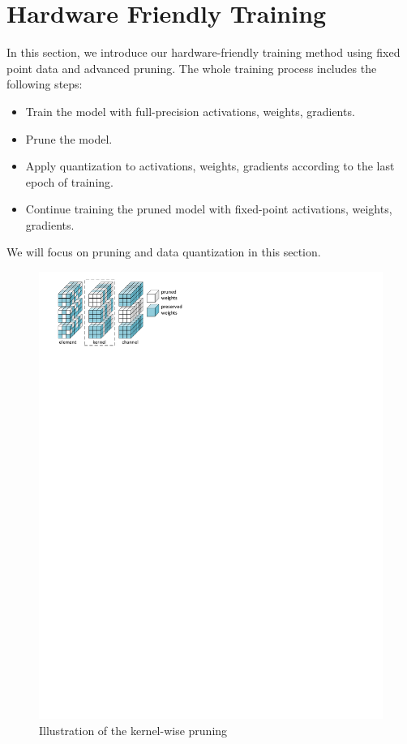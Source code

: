 \section{Hardware Friendly Training}\label{sec:training}
In this section, we introduce our hardware-friendly training method using fixed point data and advanced pruning. The whole training process includes the following steps:
\begin{itemize}
  \item Train the model with full-precision activations, weights, gradients.
  \item Prune the model. 
  \item Apply quantization to activations, weights, gradients according to the last epoch of training.  
  \item Continue training the pruned model with fixed-point activations, weights, gradients.
\end{itemize}
We will focus on pruning and data quantization in this section.

\begin{figure}[tb]
  \centering
  \includegraphics[width=0.9\columnwidth]{figures/prune.pdf}
  \caption{Illustration of the kernel-wise pruning}\label{fig:prune}
\end{figure}


